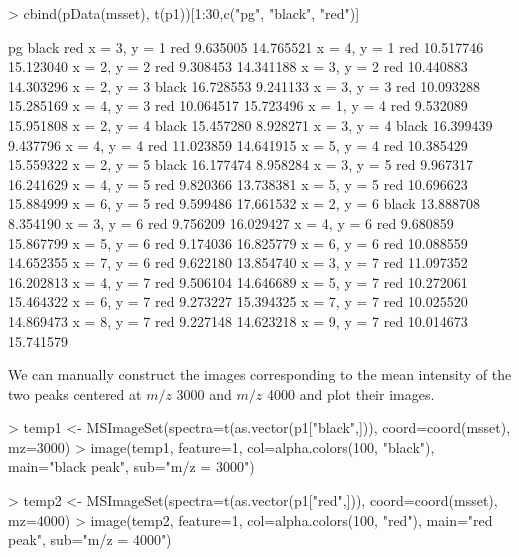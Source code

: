 \documentclass[a4paper]{article}
\begin{document}
\begin{Schunk}
\begin{Sinput}
> cbind(pData(msset), t(p1))[1:30,c("pg", "black", "red")]
\end{Sinput}
\begin{Soutput}
                pg     black       red
x = 3, y = 1   red  9.635005 14.765521
x = 4, y = 1   red 10.517746 15.123040
x = 2, y = 2   red  9.308453 14.341188
x = 3, y = 2   red 10.440883 14.303296
x = 2, y = 3 black 16.728553  9.241133
x = 3, y = 3   red 10.093288 15.285169
x = 4, y = 3   red 10.064517 15.723496
x = 1, y = 4   red  9.532089 15.951808
x = 2, y = 4 black 15.457280  8.928271
x = 3, y = 4 black 16.399439  9.437796
x = 4, y = 4   red 11.023859 14.641915
x = 5, y = 4   red 10.385429 15.559322
x = 2, y = 5 black 16.177474  8.958284
x = 3, y = 5   red  9.967317 16.241629
x = 4, y = 5   red  9.820366 13.738381
x = 5, y = 5   red 10.696623 15.884999
x = 6, y = 5   red  9.599486 17.661532
x = 2, y = 6 black 13.888708  8.354190
x = 3, y = 6   red  9.756209 16.029427
x = 4, y = 6   red  9.680859 15.867799
x = 5, y = 6   red  9.174036 16.825779
x = 6, y = 6   red 10.088559 14.652355
x = 7, y = 6   red  9.622180 13.854740
x = 3, y = 7   red 11.097352 16.202813
x = 4, y = 7   red  9.506104 14.646689
x = 5, y = 7   red 10.272061 15.464322
x = 6, y = 7   red  9.273227 15.394325
x = 7, y = 7   red 10.025520 14.869473
x = 8, y = 7   red  9.227148 14.623218
x = 9, y = 7   red 10.014673 15.741579
\end{Soutput}
\end{Schunk}
We can manually construct the images corresponding to the mean intensity of the two peaks centered at $m/z$ 3000 and $m/z$ 4000 and plot their images.
\begin{Schunk}
\begin{Sinput}
> temp1 <- MSImageSet(spectra=t(as.vector(p1["black",])), coord=coord(msset), mz=3000)
> image(temp1, feature=1, col=alpha.colors(100, "black"), main="black peak", sub="m/z = 3000")
\end{Sinput}
\end{Schunk}
\begin{Schunk}
\begin{Sinput}
> temp2 <- MSImageSet(spectra=t(as.vector(p1["red",])), coord=coord(msset), mz=4000)
> image(temp2, feature=1, col=alpha.colors(100, "red"), main="red peak", sub="m/z = 4000")
\end{Sinput}
\end{Schunk}
\end{document}
